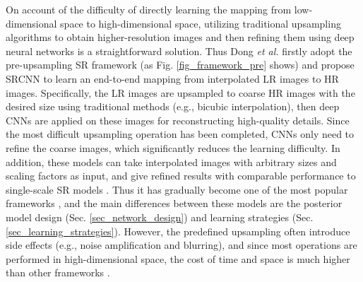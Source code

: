 \label{sec_framework_pre}
On account of the difficulty of directly learning the mapping from low-dimensional space to high-dimensional space, utilizing traditional upsampling algorithms to obtain higher-resolution images and then refining them using deep neural networks is a straightforward solution.
Thus Dong \textit{et al.}  firstly adopt the pre-upsampling SR framework (as Fig. \ref{fig_framework_pre} shows) and propose SRCNN to learn an end-to-end mapping from interpolated LR images to HR images.
Specifically, the LR images are upsampled to coarse HR images with the desired size using traditional methods (e.g., bicubic interpolation), then deep CNNs are applied on these images for reconstructing high-quality details.
Since the most difficult upsampling operation has been completed, CNNs only need to refine the coarse images, which significantly reduces the learning difficulty.
In addition, these models can take interpolated images with arbitrary sizes and scaling factors as input, and give refined results with comparable performance to single-scale SR models .
Thus it has gradually become one of the most popular frameworks , and the main differences between these models are the posterior model design (Sec. \ref{sec_network_design}) and learning strategies (Sec. \ref{sec_learning_strategies}).
However, the predefined upsampling often introduce side effects (e.g., noise amplification and blurring), and since most operations are performed in high-dimensional space, the cost of time and space is much higher than other frameworks .

